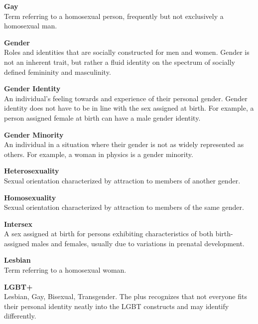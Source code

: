 \begin{titlepage}
\noindent\textbf{Gay}\\
Term referring to a homosexual person, frequently but not exclusively a homosexual man.\vspace*{\baselineskip}

\noindent\textbf{Gender}\\
Roles and identities that are socially constructed for men and women. Gender is not an inherent trait, but rather a fluid identity on the spectrum of socially defined femininity and masculinity.\vspace*{\baselineskip}

\noindent\textbf{Gender Identity}\\
An individual's feeling towards and experience of their personal gender. Gender identity does not have to be in line with the sex assigned at birth. For example, a person assigned female at birth can have a male gender identity.\vspace*{\baselineskip}

\noindent\textbf{Gender Minority}\\
An individual in a situation where their gender is not as widely represented as others. For example, a woman in physics is a gender minority.\vspace*{\baselineskip}

\noindent\textbf{Heterosexuality}\\
Sexual orientation characterized by attraction to members of another gender.\vspace*{\baselineskip}

\noindent\textbf{Homosexuality}\\
Sexual orientation characterized by attraction to members of the same gender.\vspace*{\baselineskip}

\noindent\textbf{Intersex}\\
A sex assigned at birth for persons exhibiting characteristics of both birth-assigned males and females, usually due to variations in prenatal development.\vspace*{\baselineskip}

\noindent\textbf{Lesbian}\\
Term referring to a homosexual woman.\vspace*{\baselineskip}

\noindent\textbf{LGBT+}\\
Lesbian, Gay, Bisexual, Transgender. The plus recognizes that not everyone fits their personal identity neatly into the LGBT constructs and may identify differently.\vspace*{\baselineskip}


\end{titlepage}
